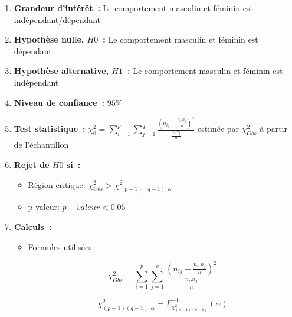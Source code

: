 \begin{enumerate}
    \item \textbf{Grandeur d'intérêt~:} Le comportement masculin et féminin est indépendant/dépendant
    \vspace{.1cm}
   \item \textbf{Hypothèse nulle, $H0$~:} Le comportement masculin et féminin est dépendant
    \vspace{.1cm}
   \item \textbf{Hypothèse alternative, $H1$~:} Le comportement masculin et féminin est indépendant
    \vspace{.1cm}
   \item \textbf{Niveau de confiance~:} $95\%$
    \vspace{.1cm}
   \item \textbf{Test statistique~:} $\chi^{2}_{0} = \sum^{p}_{i=1} \sum^{q}_{j=1} \frac{(n_{ij} - \frac{n_{i}.n_{j}}{n})^{2}}{\frac{n_{i}.n_{j}}{n}}$ estimée par $\chi^{2}_{Obs}$ à partir de l'échantillon
    \vspace{.1cm}
   \item \textbf{Rejet de $H0$ si~:}
        \begin{itemize}
            \item Région critique: $\chi^{2}_{Obs} > \chi^{2}_{(p-1)(q-1), \alpha}$
            \item p-valeur: $p-valeur < 0.05$
        \end{itemize}

    \clearpage
    \item \textbf{Calculs~:}
    \begin{itemize}
        \item Formules utilisées:
            \begin{figure}[!h]
                \centering
                \begin{minipage}{.48\linewidth}
                    \begin{equation}
                        \chi^{2}_{Obs} = \sum^{p}_{i=1} \sum^{q}_{j=1} \frac{(n_{ij} - \frac{n_{i}.n_{j}}{n})^{2}}{\frac{n_{i}.n_{j}}{n}}
                    \end{equation}
                \end{minipage}\hfill\vline
                \begin{minipage}{.48\linewidth}
                    \begin{equation}
                        \chi^{2}_{(p-1)(q-1), \alpha} = F^{-1}_{\chi^{2}_{(p-1)(q-1)}}(\alpha)
                    \end{equation}
                \end{minipage}
            \end{figure}


\end{itemize}
\end{enumerate}
